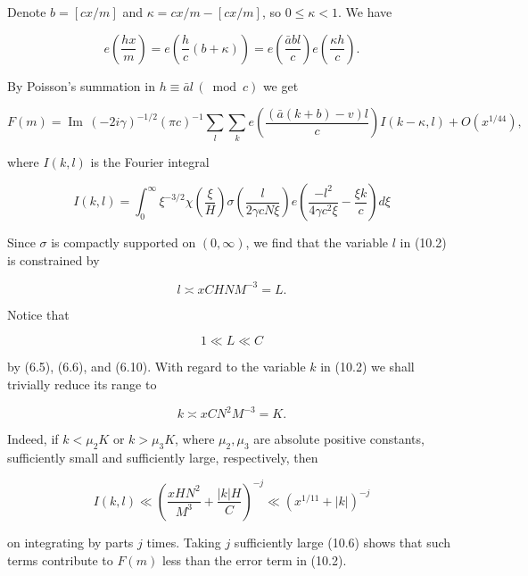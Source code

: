 \documentclass[10pt]{article}
\begin{document}
Denote $b=[c x / m]$ and $\kappa=c x / m-[c x / m]$, so $0 \leqslant \kappa<1$. We have

$$
e\left(\frac{h x}{m}\right)=e\left(\frac{h}{c}(b+\kappa)\right)=e\left(\frac{\bar{a} b l}{c}\right) e\left(\frac{\kappa h}{c}\right) .
$$

By Poisson's summation in $h \equiv \bar{a} l\, (\bmod c)$ we get


\begin{equation*}
F(m)=\operatorname{Im}\,(-2i\gamma)^{-1 / 2}(\pi c)^{-1} \sum_{l} \sum_{k} e\left(\frac{(\bar{a}(k+b)-v) l}{c}\right) I(k-\kappa, l)+O\left(x^{1 / 44}\right), \tag{10.2}
\end{equation*}


where $I(k, l)$ is the Fourier integral

$$
I(k, l)=\int_{0}^{\infty} \xi^{-3 / 2} \chi\left(\frac{\xi}{H}\right) \sigma\left(\frac{l}{2 \gamma c N \xi}\right) e\left(\frac{-l^{2}}{4 \gamma c^{2} \xi}-\frac{\xi k}{c}\right) d \xi
$$

Since $\sigma$ is compactly supported on $(0, \infty)$, we find that the variable $l$ in (10.2) is constrained by


\begin{equation*}
l \asymp x C H N M^{-3}=L . \tag{10.3}
\end{equation*}


Notice that


\begin{equation*}
1 \ll L \ll C \tag{10.4}
\end{equation*}


by (6.5), (6.6), and (6.10). With regard to the variable $k$ in (10.2) we shall trivially reduce its range to


\begin{equation*}
k \asymp x C N^{2} M^{-3}=K . \tag{10.5}
\end{equation*}


Indeed, if $k<\mu_{2} K$ or $k>\mu_{3} K$, where $\mu_{2}, \mu_{3}$ are absolute positive constants, sufficiently small and sufficiently large, respectively, then


\begin{equation*}
I(k,l)\ll\left(\frac{xHN^{2}}{M^{3}}+\frac{|k|H}{C}\right)^{-j}\ll\left(x^{1/11}+|k|\right)^{-j} \tag{10.6}
\end{equation*}


on integrating by parts $j$ times. Taking $j$ sufficiently large (10.6) shows that such terms contribute to $F(m)$ less than the error term in (10.2).
\end{document}
